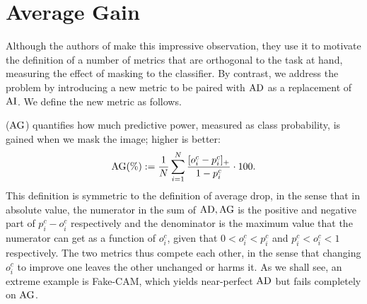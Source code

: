 \section{Average Gain}
\label{sec:av_gain}
Although the authors of \cite{poppi2021revisiting} make this impressive observation, they use it to
 motivate the definition of a number of metrics that are orthogonal to the task at hand, \ie 
 measuring the effect of masking to the classifier. By contrast, we address the problem by 
 introducing a new metric to be paired with $\operatorname{AD}$ as a replacement of $\operatorname{AI}$. 
 We define the new metric as follows.

\emph{\Agf} ($\operatorname{AG}$) quantifies how much predictive power, measured as class probability, is gained
 when we mask the image; higher is better:
\begin{equation}
	\operatorname{AG}(\%) \mathrel{:=} \frac{1}{N} \sum_{i=1}^N \frac{[o^c_i - p^c_i]_+}{1-p^c_i} \cdot 100.
\label{eq:ag}
\end{equation}
This definition is symmetric to the definition of average drop, in the sense that in absolute value,
 the numerator in the sum of $\operatorname{AD}, \operatorname{AG}$ is the positive and negative part of $p^c_i - o^c_i$ 
 respectively and the denominator is the maximum value that the numerator can get as a function of 
 $o^c_i$, given that $0 < o^c_i < p^c_i$ and $p^c_i < o^c_i < 1$ respectively. The two metrics thus 
 compete each other, in the sense that changing $o^c_i$ to improve one leaves the other unchanged or 
 harms it. As we shall see, an extreme example is Fake-CAM, which yields near-perfect $\operatorname{AD}$ but 
 fails completely on $\operatorname{AG}$.

